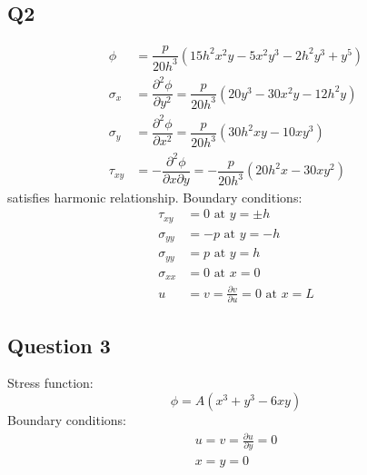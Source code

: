 \documentclass[11pt]{article}
\numberwithin{equation}{section}
\begin{document}
\subsection{Q2}
\begin{align}
    \phi      & = \dfrac{p}{20h^3} \left(15h^2x^2y-5x^2y^3-2h^2y^3+y^5\right)                                    \\
    \sigma_x  & = \dfrac{\partial^2 \phi}{\partial y^2} = \dfrac{p}{20h^3}\left(20y^3 -30x^2y-12h^2y\right)      \\
    \sigma_y  & = \dfrac{\partial^2 \phi}{\partial x^2} = \dfrac{p}{20h^3}\left(30h^2xy-10xy^3\right)            \\
    \tau_{xy} & = -\dfrac{\partial^2 \phi}{\partial x\partial y} = - \dfrac{p}{20h^3} \left(20h^2x-30xy^2\right)
\end{align}
satisfies harmonic relationship. Boundary conditions:
\begin{align}
    \tau_{xy}   & = 0 \textrm{ at } y = \pm h                                 \\
    \sigma_{yy} & = -p \textrm{ at } y = -h                                   \\
    \sigma_{yy} & = p \textrm{ at } y = h                                     \\
    \sigma_{xx} & = 0 \textrm{ at } x = 0                                     \\
    u           & = v = \frac{\partial v}{\partial u} = 0 \textrm{ at } x = L
\end{align}
\subsection{Question 3}
Stress function:
\begin{equation}
    \phi = A \left(x^3 + y^3 -6xy\right)
\end{equation}
Boundary conditions:
\begin{align}
    u = v = \frac{\partial u}{\partial y} = 0 \\
    x = y = 0
\end{align}
\end{document}
